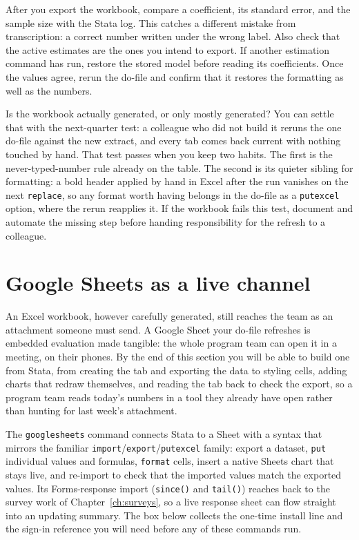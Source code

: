 After you export the workbook, compare a coefficient, its standard error, and the sample size with the Stata log. This catches a different mistake from transcription: a correct number written under the wrong label. Also check that the active estimates are the ones you intend to export. If another estimation command has run, restore the stored model before reading its coefficients. Once the values agree, rerun the do-file and confirm that it restores the formatting as well as the numbers.

Is the workbook actually generated, or only mostly generated? You can settle that with the next-quarter test: a colleague who did not build it reruns the one do-file against the new extract, and every tab comes back current with nothing touched by hand. That test passes when you keep two habits. The first is the never-typed-number rule already on the table. The second is its quieter sibling for formatting: a bold header applied by hand in Excel after the run vanishes on the next \texttt{replace}, so any format worth having belongs in the do-file as a \texttt{putexcel} option, where the rerun reapplies it. If the workbook fails this test, document and automate the missing step before handing responsibility for the refresh to a colleague.

\section{Google Sheets as a live channel}\label{sec:googlesheets}
An Excel workbook, however carefully generated, still reaches the team as an attachment someone must send. A Google Sheet your do-file refreshes is embedded evaluation made tangible: the whole program team can open it in a meeting, on their phones. By the end of this section you will be able to build one from Stata, from creating the tab and exporting the data to styling cells, adding charts that redraw themselves, and reading the tab back to check the export, so a program team reads today's numbers in a tool they already have open rather than hunting for last week's attachment.

The \texttt{googlesheets} command connects Stata to a Sheet with a syntax that mirrors the familiar \texttt{import}/\texttt{export}/\texttt{putexcel} family: export a dataset, \texttt{put} individual values and formulas, \texttt{format} cells, insert a native Sheets chart that stays live, and re-import to check that the imported values match the exported values. Its Forms-response import (\texttt{since()} and \texttt{tail()}) reaches back to the survey work of Chapter~\ref{ch:surveys}, so a live response sheet can flow straight into an updating summary. The box below collects the one-time install line and the sign-in reference you will need before any of these commands run.

